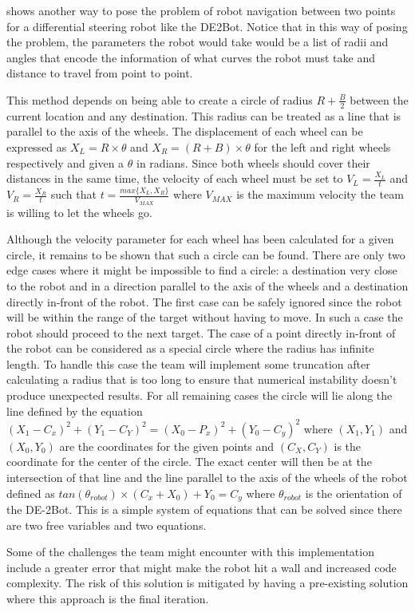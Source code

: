 \documentclass[11pt,conference,onecolumn]{article} %
\begin{document}
 shows another way to pose the problem of robot navigation between two points for a differential steering robot like the DE2Bot. Notice that in this way of posing the problem, the parameters the robot would take would be a list of radii and angles that encode the information of what curves the robot must take and distance to travel from point to point.\par
This method depends on being able to create a circle of radius $R+\frac{B}{2}$ between the current location and any destination. This radius can be treated as a line that is parallel to the axis of the wheels. The displacement of each wheel can be expressed as $X_{L} = R \times \theta$ and $X_{R} = (R + B) \times \theta$ for the left and right wheels respectively and given a $\theta$ in radians. Since both wheels should cover their distances in the same time, the velocity of each wheel must be set to $V_{L} = \frac{X_{L}}{t}$ and  $V_{R} = \frac{X_{R}}{t}$ such that $t  = \frac{max\{X_{L}, X_{R}\}}{V_{MAX}}$ where $V_{MAX}$ is the maximum velocity the team is  willing to let the wheels go.\par
Although the velocity parameter for each wheel has been calculated for a given circle, it remains to be shown that such a circle can be found. There are only two edge cases where it might be impossible to find a circle: a destination very close to the robot and in a direction parallel to the axis of the wheels and a destination directly in-front of the robot. The first case can be safely ignored since the robot will be within the range of the target without having to move. In such a case the robot should proceed to the next target. The case of a point directly in-front of the robot can be considered as a special circle where the radius has infinite length. To handle this case the team will implement some truncation after calculating a radius that is too long to ensure that numerical instability doesn't produce unexpected results. For all remaining cases the circle will lie along the line defined by the equation $(X_1 - C_x)^2 + (Y_1 - C_Y)^2 = (X_0 - P_x)^2 + (Y_0 - C_y)^2$ where $(X_1,Y_1)$ and $(X_0,Y_0)$ are the coordinates for the given points and $(C_X,C_Y)$ is the coordinate for the center of the circle. The exact center will then be at the intersection of that line and the line parallel to the axis of the wheels of the robot defined as $tan(\theta_{robot}) \times (C_x + X_0) + Y_0 = C_y$ where $\theta_{robot}$ is the orientation of the DE-2Bot. This is a simple system of equations that can be solved since there are two free variables and two equations.\par
Some of the challenges the team might encounter with this implementation include a greater error that might make the robot hit a wall and increased code complexity. The risk of this solution is mitigated by having a pre-existing solution where this approach is the final iteration.
\end{document}

